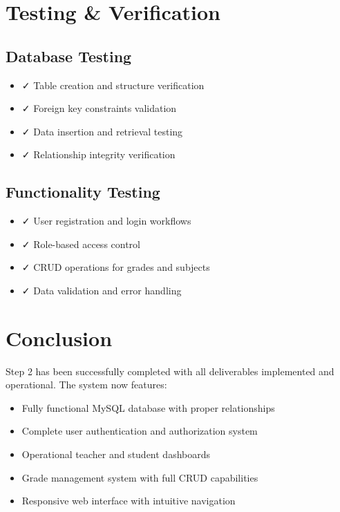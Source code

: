 \documentclass[12pt,a4paper]{article}
\begin{document}
\section{Testing \& Verification}

\subsection{Database Testing}
\begin{itemize}
    \item ✓ Table creation and structure verification
    \item ✓ Foreign key constraints validation
    \item ✓ Data insertion and retrieval testing
    \item ✓ Relationship integrity verification
\end{itemize}

\subsection{Functionality Testing}
\begin{itemize}
    \item ✓ User registration and login workflows
    \item ✓ Role-based access control
    \item ✓ CRUD operations for grades and subjects
    \item ✓ Data validation and error handling
\end{itemize}

\section{Conclusion}

Step 2 has been successfully completed with all deliverables implemented and operational. The system now features:

\begin{itemize}
    \item Fully functional MySQL database with proper relationships
    \item Complete user authentication and authorization system
    \item Operational teacher and student dashboards
    \item Grade management system with full CRUD capabilities
    \item Responsive web interface with intuitive navigation
\end{itemize}
\end{document}
